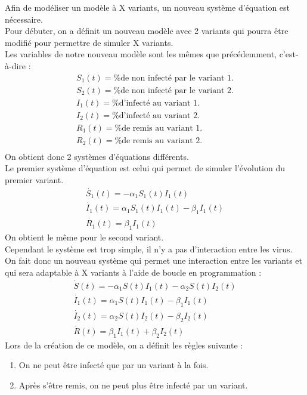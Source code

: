 \documentclass{article}
\begin{document}
Afin de modéliser un modèle à X variants, un nouveau système d'équation est nécessaire.\\ 
Pour débuter, on a définit un nouveau modèle avec 2 variants qui pourra être modifié pour permettre de simuler X variants.\\
\noindent
Les variables de notre nouveau modèle sont les mêmes que précédemment, c'est-à-dire :
\begin{align}
    S_1(t)= \text{\% de non infecté par le variant 1.} \\
    S_2(t)= \text{\% de non infecté par le variant 2.} \\
    I_1(t)= \text{\% d'infecté au variant 1.} \\
    I_2(t)= \text{\% d'infecté au variant 2.} \\
    R_1(t)= \text{\% de remis au variant 1.} \\
    R_2(t)= \text{\% de remis au variant 2.} \\
\end{align}
\noindent
On obtient donc 2 systèmes d'équations différents. \\
\noindent
Le premier système d'équation est celui qui permet de simuler l'évolution du premier variant.\\
\begin{align}
    \dot{S_1}(t)= -\alpha_1 S_1(t)I_1(t) \\
    \dot{I_1}(t)= \alpha_1 S_1(t)I_1(t)-\beta_1 I_1(t) \\
    \dot{R_1}(t)= \beta_1 I_1(t)
\end{align}
On obtient le même pour le second variant. \\
Cependant le système est trop simple, il n'y a pas d'interaction entre les virus. \\
On fait donc un nouveau système qui permet une interaction entre les variants et qui sera adaptable à X variants à l'aide de boucle en programmation :
\begin{align}
    \dot{S}(t)= -\alpha_1 S(t)I_1(t) - \alpha_2 S(t)I_2(t) \\
    \dot{I_1}(t)= \alpha_1 S(t)I_1(t)-\beta_1 I_1(t) \\
    \dot{I_2}(t)= \alpha_2 S(t)I_2(t)-\beta_2 I_2(t) \\
    \dot{R}(t)= \beta_1 I_1(t) + \beta_2 I_2(t)
\end{align}
\noindent
Lors de la création de ce modèle, on a définit les règles suivante : \\
\begin{enumerate}
    \item On ne peut être infecté que par un variant à la fois. \\
    \item Après s'être remis, on ne peut plus être infecté par un variant. \\
\end{enumerate}
\end{document}

